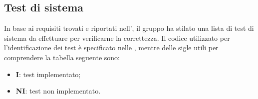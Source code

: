\subsection{Test di sistema}
In base ai requisiti trovati e riportati nell'\AdRv{}, il gruppo ha stilato una lista di test di sistema da effettuare per verificarne la correttezza.
Il codice utilizzato per l'identificazione dei test è specificato nelle \NdPv{}, mentre delle sigle utili per comprendere la tabella seguente sono:
\begin{itemize}
	\item \textbf{I}: test implementato;
	\item \textbf{NI}: test non implementato.
\end{itemize} 

\newpage
\renewcommand{\arraystretch}{1.5}
\renewcommand{\arraystretch}{1.5}
\renewcommand\extrarowheight{1.5pt}

